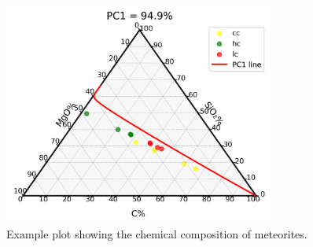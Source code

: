 
\begin{figure}[H]
    \centering
    \includegraphics[width=0.8\textwidth]{figures/ternary_plot.png}
    \caption{Example plot showing the chemical composition of meteorites.}
    \label{fig:ternary}
\end{figure}